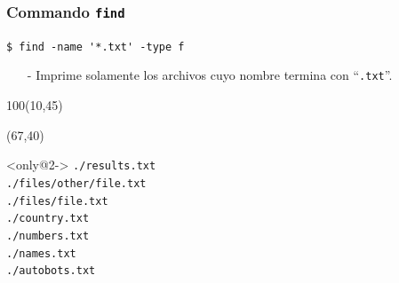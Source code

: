 \documentclass{beamer}
\begin{document}
\begin{frame}[fragile,t]
    \frametitle{Commando \texttt{find}}
    \begin{block}{\vspace*{-3ex}}
    \texttt{\$}\verb: find -name '*.txt' -type f:
    \vspace*{0.5ex}
    \end{block}
    \begin{itemize}
    \item[-] Imprime solamente los archivos cuyo nombre termina con ``\verb|.txt|''.
    \end{itemize}
    \begin{textblock}{100}(10,45)
    \begin{center}
    \end{center}
    \end{textblock}
    \begin{textblock}{50}(67,40)
     \vspace{-0.5cm}
    \begin{block}<only@2->{\vspace*{-3ex}}
    \small
    \verb:./results.txt:\\
    \verb:./files/other/file.txt:\\
    \verb:./files/file.txt:\\
    \verb:./country.txt:\\
    \verb:./numbers.txt:\\
    \verb:./names.txt:\\
    \verb:./autobots.txt:\\
    \vspace*{0.5ex}
    \end{block}
    \end{textblock}
\end{frame}
\end{document}
